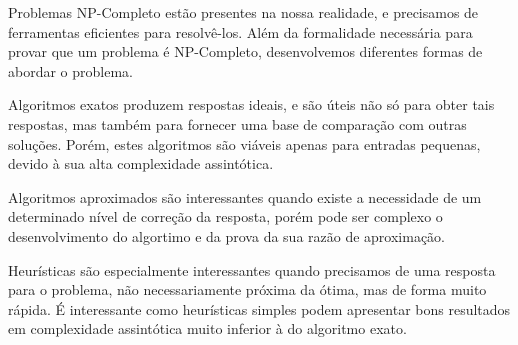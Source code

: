 \documentclass{article}
\begin{document}
Problemas NP-Completo estão presentes na nossa realidade, e precisamos de ferramentas eficientes para resolvê-los. Além da formalidade necessária para provar que um problema é NP-Completo, desenvolvemos diferentes formas de abordar o problema.

Algoritmos exatos produzem respostas ideais, e são úteis não só para obter tais respostas, mas também para fornecer uma base de comparação com outras soluções. Porém, estes algoritmos são viáveis apenas para entradas pequenas, devido à sua alta complexidade assintótica.

Algoritmos aproximados são interessantes quando existe a necessidade de um determinado nível de \mbox{correção} da resposta, porém pode ser complexo o desenvolvimento do algortimo e da prova da sua razão de aproximação.

Heurísticas são especialmente interessantes quando precisamos de uma resposta para o problema, não necessariamente próxima da ótima, mas de forma muito rápida. É interessante como heurísticas simples podem apresentar bons resultados em complexidade assintótica muito inferior à do algoritmo exato.


\pagebreak



\end{document}
